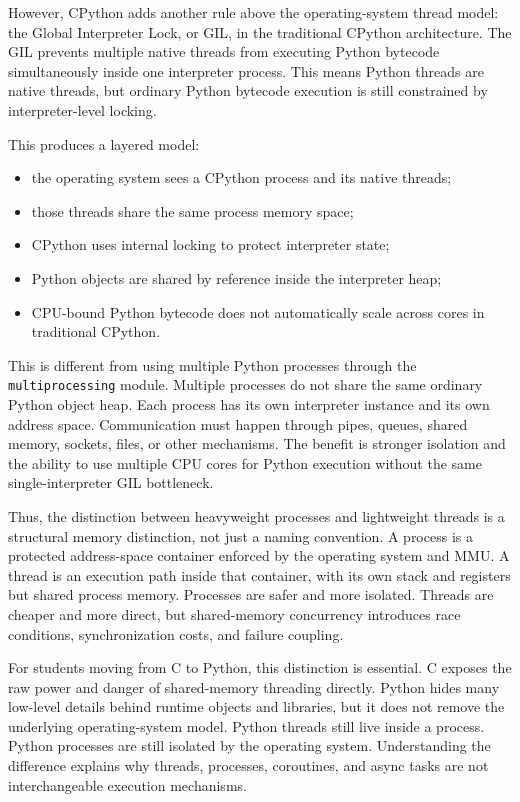 However, CPython adds another rule above the operating-system thread model: the Global Interpreter Lock, or GIL, in the traditional CPython architecture. The GIL prevents multiple native threads from executing Python bytecode simultaneously inside one interpreter process. This means Python threads are native threads, but ordinary Python bytecode execution is still constrained by interpreter-level locking.

This produces a layered model:

\begin{itemize}
    \item the operating system sees a CPython process and its native threads;
    \item those threads share the same process memory space;
    \item CPython uses internal locking to protect interpreter state;
    \item Python objects are shared by reference inside the interpreter heap;
    \item CPU-bound Python bytecode does not automatically scale across cores in traditional CPython.
\end{itemize}

This is different from using multiple Python processes through the \texttt{multiprocessing} module. Multiple processes do not share the same ordinary Python object heap. Each process has its own interpreter instance and its own address space. Communication must happen through pipes, queues, shared memory, sockets, files, or other mechanisms. The benefit is stronger isolation and the ability to use multiple CPU cores for Python execution without the same single-interpreter GIL bottleneck.

Thus, the distinction between heavyweight processes and lightweight threads is a structural memory distinction, not just a naming convention. A process is a protected address-space container enforced by the operating system and MMU. A thread is an execution path inside that container, with its own stack and registers but shared process memory. Processes are safer and more isolated. Threads are cheaper and more direct, but shared-memory concurrency introduces race conditions, synchronization costs, and failure coupling.

For students moving from C to Python, this distinction is essential. C exposes the raw power and danger of shared-memory threading directly. Python hides many low-level details behind runtime objects and libraries, but it does not remove the underlying operating-system model. Python threads still live inside a process. Python processes are still isolated by the operating system. Understanding the difference explains why threads, processes, coroutines, and async tasks are not interchangeable execution mechanisms.





